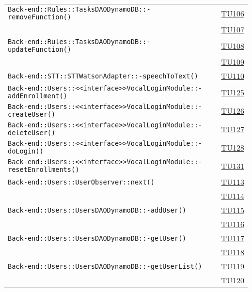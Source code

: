 \begin{longtable}{|>{\centering}m{12cm}|m{1cm}<{\centering}|}
\texttt{Back-end::Rules::TasksDAODynamoDB::-\linebreak removeFunction()} & \hyperlink{TU106}{TU106}\\ & \hyperlink{TU107}{TU107}\\ \hline
\texttt{Back-end::Rules::TasksDAODynamoDB::-\linebreak updateFunction()} & \hyperlink{TU108}{TU108}\\ & \hyperlink{TU109}{TU109}\\ \hline
\texttt{Back-end::STT::STTWatsonAdapter::-\linebreak speechToText()} & \hyperlink{TU110}{TU110}\\ \hline
\texttt{Back-end::Users::<<interface>>VocalLoginModule::-\linebreak addEnrollment()} & \hyperlink{TU125}{TU125}\\ \hline
\texttt{Back-end::Users::<<interface>>VocalLoginModule::-\linebreak createUser()} & \hyperlink{TU126}{TU126}\\ \hline
\texttt{Back-end::Users::<<interface>>VocalLoginModule::-\linebreak deleteUser()} & \hyperlink{TU127}{TU127}\\ \hline
\texttt{Back-end::Users::<<interface>>VocalLoginModule::-\linebreak doLogin()} & \hyperlink{TU128}{TU128}\\ \hline
\texttt{Back-end::Users::<<interface>>VocalLoginModule::-\linebreak resetEnrollments()} & \hyperlink{TU131}{TU131}\\ \hline
\texttt{Back-end::Users::UserObserver::next()} & \hyperlink{TU113}{TU113}\\ & \hyperlink{TU114}{TU114}\\ \hline
\texttt{Back-end::Users::UsersDAODynamoDB::-\linebreak addUser()} & \hyperlink{TU115}{TU115}\\ & \hyperlink{TU116}{TU116}\\ \hline
\texttt{Back-end::Users::UsersDAODynamoDB::-\linebreak getUser()} & \hyperlink{TU117}{TU117}\\ & \hyperlink{TU118}{TU118}\\ \hline
\texttt{Back-end::Users::UsersDAODynamoDB::-\linebreak getUserList()} & \hyperlink{TU119}{TU119}\\ & \hyperlink{TU120}{TU120}\\ \hline

\end{longtable}
